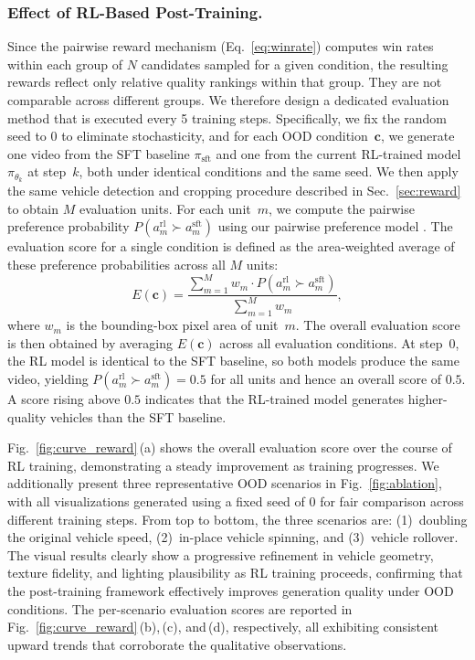 \documentclass[runningheads]{llncs}
\begin{document}
\subsubsection{Effect of RL-Based Post-Training.}
\label{sec:ablation_rl}
Since the pairwise reward mechanism (Eq.~\ref{eq:winrate}) computes win rates within each group of $N$ candidates sampled for a given condition, the resulting rewards reflect only relative quality rankings within that group. They are not comparable across different groups. We therefore design a dedicated evaluation method that is executed every 5 training steps. Specifically, we fix the random seed to 0 to eliminate stochasticity, and for each OOD condition~$\mathbf{c}$, we generate one video from the SFT baseline $\pi_{\mathrm{sft}}$ and one from the current RL-trained model $\pi_{\theta_k}$ at step~$k$, both under identical conditions and the same seed. We then apply the same vehicle detection and cropping procedure described in Sec.~\ref{sec:reward} to obtain $M$ evaluation units. For each unit~$m$, we compute the pairwise preference probability $P(a_m^{\mathrm{rl}}\!\succ\!a_m^{\mathrm{sft}})$ using our pairwise preference model . The evaluation score for a single condition is defined as the area-weighted average of these preference probabilities across all $M$ units:
%
\begin{equation}
  E(\mathbf{c})
  = \frac{\sum_{m=1}^{M} w_m \cdot P(a_m^{\mathrm{rl}}\!\succ\!a_m^{\mathrm{sft}})}
         {\sum_{m=1}^{M} w_m},
  \label{eq:eval}
\end{equation}
%
where $w_m$ is the bounding-box pixel area of unit~$m$. The overall evaluation score is then obtained by averaging $E(\mathbf{c})$ across all evaluation conditions. At step~0, the RL model is identical to the SFT baseline, so both models produce the same video, yielding $P(a_m^{\mathrm{rl}}\!\succ\!a_m^{\mathrm{sft}})=0.5$ for all units and hence an overall score of $0.5$. A score rising above $0.5$ indicates that the RL-trained model generates higher-quality vehicles than the SFT baseline.

Fig.~\ref{fig:curve_reward}\,(a) shows the overall evaluation score over the course of RL training, demonstrating a steady improvement as training progresses. We additionally present three representative OOD scenarios in Fig.~\ref{fig:ablation}, with all visualizations generated using a fixed seed of 0 for fair comparison across different training steps. From top to bottom, the three scenarios are: (1)~doubling the original vehicle speed, (2)~in-place vehicle spinning, and (3)~vehicle rollover. The visual results clearly show a progressive refinement in vehicle geometry, texture fidelity, and lighting plausibility as RL training proceeds, confirming that the post-training framework effectively improves generation quality under OOD conditions. The per-scenario evaluation scores are reported in Fig.~\ref{fig:curve_reward}\,(b),\,(c), and\,(d), respectively, all exhibiting consistent upward trends that corroborate the qualitative observations.
\end{document}
